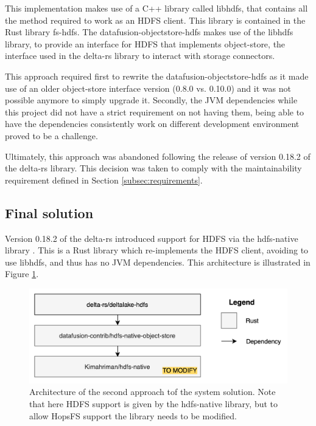 This implementation makes use of a C++ library called libhdfs, that contains all the method required to work as an \gls{HDFS} client. This library is contained in the Rust library fs-hdfs. The datafusion-objectstore-hdfs makes use of the libhdfs library, to provide an interface for \gls{HDFS} that implements object-store, the interface used in the delta-rs library to interact with storage connectors.

This approach required first to rewrite the datafusion-objectstore-hdfs as it made use of an older object-store interface version (0.8.0 vs. 0.10.0) and it was not possible anymore to simply upgrade it. Secondly, the \gls{JVM} dependencies while this project did not have a strict requirement on not having them, being able to have the dependencies consistently work on different development environment proved to be a challenge. 

Ultimately, this approach was abandoned following the release of version 0.18.2 of the delta-rs library. This decision was taken to comply with the maintainability requirement defined in Section \ref{subsec:requirements}.

\subsection{Final solution}

Version 0.18.2 of the delta-rs introduced support for \gls{HDFS} via the hdfs-native library \cite{binfordKimahrimanHdfsnative2024}. This is a Rust library which re-implements the \gls{HDFS} client, avoiding to use libhdfs, and thus has no \gls{JVM} dependencies. This architecture is illustrated in Figure \ref{fig:approach_2_solution_schema}.

\begin{figure}[!ht]
  \begin{center}
    \includegraphics[width=\textwidth]{figures/4-implementation/hdfs-native.png}
  \caption{Architecture of the second approach tof the system solution. Note that here \gls{HDFS} support is given by the hdfs-native library, but to allow \gls{HopsFS} support the library needs to be modified.}
  \label{fig:approach_2_solution_schema}
  \end{center}
\end{figure}

